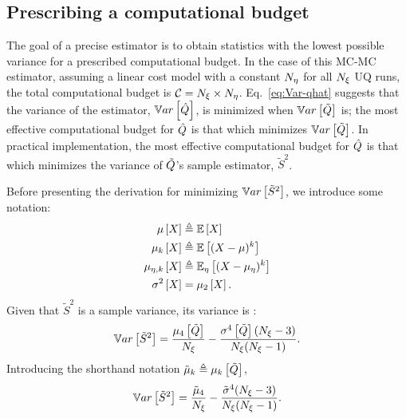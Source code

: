 \subsection{Prescribing a computational budget}\label{sec:method-uqbudget} %
The goal of a precise estimator is to obtain statistics with the lowest possible variance for a prescribed computational budget. In the case of this MC-MC estimator, assuming a linear cost model with a constant ${N_\eta}$ for all ${N_\xi}$ UQ runs, the total computational budget is $\mathcal{C}={N_\xi} \times {N_\eta}$. Eq.~\eqref{eq:Var-qhat} suggests that the variance of the estimator, $\mathbb{V}ar\left[\hat{Q}\right]$, is minimized when $\mathbb{V}ar\left[\tilde{Q}\right]$ is; the most effective computational budget for $\hat{Q}$ is that which minimizes $\mathbb{V}ar\left[\tilde{Q}\right]$. In practical implementation, the most effective computational budget for $\hat{Q}$ is that which minimizes the variance of $\tilde{Q}$'s sample estimator, $\tilde{S}^2$. 

\noindent Before presenting the derivation for minimizing $\mathbb{V}ar\left[\tilde{S}^2\right]$, we introduce some notation:
\begin{equation}
    \begin{split}
        \mu\left[ X \right] &\triangleq \mathbb{E}\left[ X \right] \\
        \mu_k\left[ X \right] &\triangleq \mathbb{E}\left[ (X-\mu)^k \right] \\
        \mu_{\eta,k}\left[ X \right] &\triangleq \mathbb{E}_\eta\left[ (X-\mu_\eta)^k \right] \\
        \sigma^2\left[ X \right] &= \mu_2\left[ X \right] .
    \end{split}
\end{equation}
Given that $\tilde{S}^2$ is a sample variance, its variance is \cite{Cho}:
\begin{equation}
    \mathbb{V}ar\left[\tilde{S}^2\right] = \frac{\mu_4\left[\tilde{Q}\right]}{{N_\xi}} - \frac{ \sigma^4\left[\tilde{Q}\right]({N_\xi}-3) }{ {N_\xi} ({N_\xi}-1) }.
\end{equation}
Introducing the shorthand notation $\tilde{\mu}_k \triangleq \mu_k\left[\tilde{Q}\right]$, 
\begin{equation}\label{eq:var-s2-tilde}
    \mathbb{V}ar\left[\tilde{S}^2\right] = \frac{\tilde{\mu}_4}{{N_\xi}} - \frac{ \tilde{\sigma}^4 ({N_\xi}-3) }{ {N_\xi} ({N_\xi}-1) }.
\end{equation}

